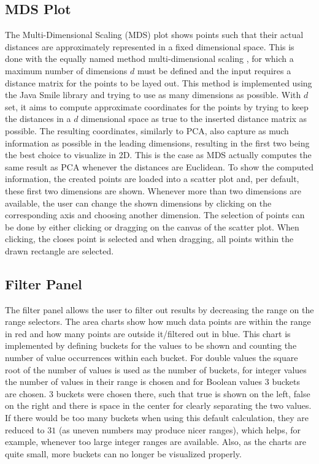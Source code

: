 \documentclass[
	a4paper,
	english,
	twoside,
	openright,               
	11pt                            
	]{report}
\begin{document}
\subsection{MDS Plot}
The Multi-Dimensional Scaling (MDS) plot shows points such that their actual distances are approximately represented in a fixed dimensional space. This is done with the equally named method multi-dimensional scaling \cite{mds}, for which a maximum number of dimensions $d$ must be defined and the input requires a distance matrix for the points to be layed out. This method is implemented using the Java Smile \cite{javasmile} library and trying to use as many dimensions as possible. With $d$ set, it aims to compute approximate coordinates for the points by trying to keep the distances in a $d$ dimensional space as true to the inserted distance matrix as possible. The resulting coordinates, similarly to PCA, also capture as much information as possible in the leading dimensions, resulting in the first two being the best choice to visualize in 2D. This is the case as MDS actually computes the same result as PCA whenever the distances are Euclidean. To show the computed information, the created points are loaded into a scatter plot and, per default, these first two dimensions are shown. Whenever more than two dimensions are available, the user can change the shown dimensions by clicking on the corresponding axis and choosing another dimension. The selection of points can be done by either clicking or dragging on the canvas of the scatter plot. When clicking, the closes point is selected and when dragging, all points within the drawn rectangle are selected.

\subsection{Filter Panel}
The filter panel allows the user to filter out results by decreasing the range on the range selectors. The area charts show how much data points are within the range in red and how many points are outside it/filtered out in blue. This chart is implemented by defining buckets for the values to be shown and counting the number of value occurrences within each bucket. For double values the square root of the number of values is used as the number of buckets, for integer values the number of values in their range is chosen and for Boolean values $3$ buckets are chosen. $3$ buckets were chosen there, such that true is shown on the left, false on the right and there is space in the center for clearly separating the two values. If there would be too many buckets when using this default calculation, they are reduced to $31$ (as uneven numbers may produce nicer ranges), which helps, for example, whenever too large integer ranges are available. Also, as the charts are quite small, more buckets can no longer be visualized properly.
\end{document}

